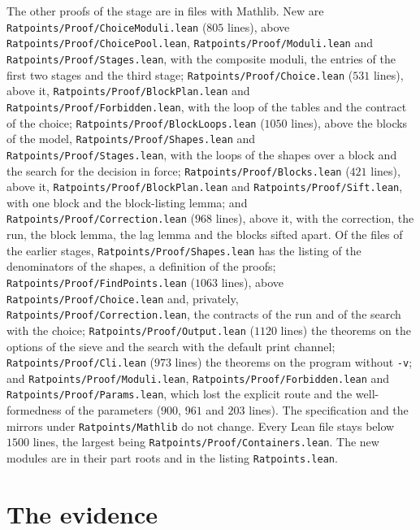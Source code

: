 The other proofs of the stage are in files with Mathlib. New are
\verb|Ratpoints/Proof/ChoiceModuli.lean| ($805$ lines), above
\verb|Ratpoints/Proof/ChoicePool.lean|, \verb|Ratpoints/Proof/Moduli.lean| and
\verb|Ratpoints/Proof/Stages.lean|, with the composite moduli, the entries of the first two stages
and the third stage; \verb|Ratpoints/Proof/Choice.lean| ($531$ lines), above it,
\verb|Ratpoints/Proof/BlockPlan.lean| and \verb|Ratpoints/Proof/Forbidden.lean|, with the loop of
the tables and the contract of the choice; \verb|Ratpoints/Proof/BlockLoops.lean| ($1050$ lines),
above the blocks of the model, \verb|Ratpoints/Proof/Shapes.lean| and
\verb|Ratpoints/Proof/Stages.lean|, with the loops of the shapes over a block and the search for the
decision in force; \verb|Ratpoints/Proof/Blocks.lean| ($421$ lines), above it,
\verb|Ratpoints/Proof/BlockPlan.lean| and \verb|Ratpoints/Proof/Sift.lean|, with one block and the
block-listing lemma; and \verb|Ratpoints/Proof/Correction.lean| ($968$ lines), above it, with the
correction, the run, the block lemma, the lag lemma and the blocks sifted apart. Of the files of the
earlier stages, \verb|Ratpoints/Proof/Shapes.lean| has the listing of the denominators of the
shapes, a definition of the proofs; \verb|Ratpoints/Proof/FindPoints.lean| ($1063$ lines), above
\verb|Ratpoints/Proof/Choice.lean| and, privately, \verb|Ratpoints/Proof/Correction.lean|, the
contracts of the run and of the search with the choice; \verb|Ratpoints/Proof/Output.lean| ($1120$
lines) the theorems on the options of the sieve and the search with the default print channel;
\verb|Ratpoints/Proof/Cli.lean| ($973$ lines) the theorems on the program without \verb|-v|; and
\verb|Ratpoints/Proof/Moduli.lean|, \verb|Ratpoints/Proof/Forbidden.lean| and
\verb|Ratpoints/Proof/Params.lean|, which lost the explicit route and the well-formedness of the
parameters ($900$, $961$ and $203$ lines). The specification and the mirrors under
\verb|Ratpoints/Mathlib| do not change. Every Lean file stays below $1500$ lines, the largest being
\verb|Ratpoints/Proof/Containers.lean|. The new modules are in their part roots and in the listing
\verb|Ratpoints.lean|.

\section{The evidence}\label{sec:moduli-evidence}


